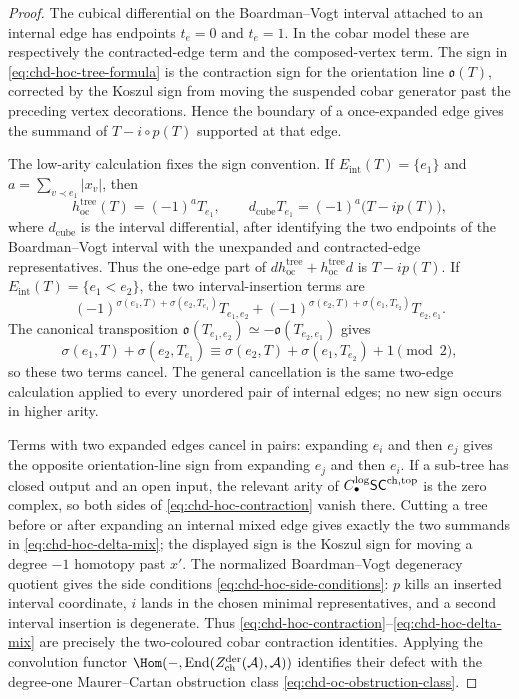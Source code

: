 \begin{proof}
The cubical differential on the Boardman--Vogt interval attached to
an internal edge has endpoints \(t_e=0\) and \(t_e=1\). In the cobar
model these are respectively the contracted-edge term and the
composed-vertex term. The sign in
\eqref{eq:chd-hoc-tree-formula} is the contraction sign for the
orientation line \(\mathfrak{o}(T)\), corrected by the Koszul sign
from moving the suspended cobar generator past the preceding vertex
decorations. Hence the boundary of a once-expanded edge gives the
summand of \(T-i\circ p(T)\) supported at that edge.

The low-arity calculation fixes the sign convention.  If
\(E_{\mathrm{int}}(T)=\{e_1\}\) and
\(a=\sum_{v\prec e_1}|x_v|\), then
\[
 h_{\mathrm{oc}}^{\mathrm{tree}}(T)=(-1)^aT_{e_1},
 \qquad
 d_{\mathrm{cube}}T_{e_1}=(-1)^a\bigl(T-i p(T)\bigr),
\]
where \(d_{\mathrm{cube}}\) is the interval differential, after
identifying the two endpoints of the Boardman--Vogt interval with the
unexpanded and contracted-edge representatives.  Thus the
one-edge part of
\(d h_{\mathrm{oc}}^{\mathrm{tree}}
+h_{\mathrm{oc}}^{\mathrm{tree}}d\)
is \(T-i p(T)\).  If
\(E_{\mathrm{int}}(T)=\{e_1<e_2\}\), the two interval-insertion terms
are
\[
 (-1)^{\sigma(e_1,T)+\sigma(e_2,T_{e_1})}T_{e_1,e_2}
 +
 (-1)^{\sigma(e_2,T)+\sigma(e_1,T_{e_2})}T_{e_2,e_1}.
\]
The canonical transposition
\(\mathfrak{o}(T_{e_1,e_2})\simeq-\mathfrak{o}(T_{e_2,e_1})\) gives
\[
 \sigma(e_1,T)+\sigma(e_2,T_{e_1})
 \equiv
 \sigma(e_2,T)+\sigma(e_1,T_{e_2})+1
 \pmod 2,
\]
so these two terms cancel.  The general cancellation is the same
two-edge calculation applied to every unordered pair of internal
edges; no new sign occurs in higher arity.

Terms with two expanded edges cancel in pairs: expanding \(e_i\) and
then \(e_j\) gives the opposite orientation-line sign from expanding
\(e_j\) and then \(e_i\). If a sub-tree has closed output and an open
input, the relevant arity of \(C_\bullet^{\log}\mathsf{SC}^{\mathrm{ch},\mathrm{top}}\) is the zero
complex, so both sides of
\eqref{eq:chd-hoc-contraction} vanish there. Cutting a tree before or
after expanding an internal mixed edge gives exactly the two summands
in \eqref{eq:chd-hoc-delta-mix}; the displayed sign is the Koszul sign
for moving a degree \(-1\) homotopy past \(x'\). The normalized
Boardman--Vogt degeneracy quotient gives the side conditions
\eqref{eq:chd-hoc-side-conditions}: \(p\) kills an inserted interval
coordinate, \(i\) lands in the chosen minimal representatives, and a
second interval insertion is degenerate. Thus
\eqref{eq:chd-hoc-contraction}--\eqref{eq:chd-hoc-delta-mix} are
precisely the two-coloured cobar contraction identities. Applying the
convolution functor
\(\Hom(-,\End(Z^{\mathrm{der}}_{\mathrm{ch}}(\cA),\cA))\) identifies
their defect with the degree-one Maurer--Cartan obstruction class
\eqref{eq:chd-oc-obstruction-class}.
\end{proof}

